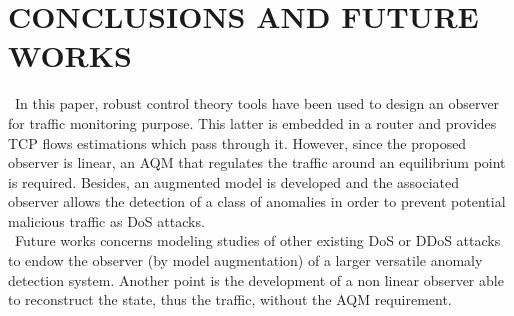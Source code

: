 \documentclass[a4paper, 10pt, onecolumn]{article}
\begin{document}
\section{CONCLUSIONS AND FUTURE WORKS}
~\indent In this paper, robust control theory tools have been used to design an observer for traffic monitoring purpose. This latter is embedded in a router and provides TCP flows estimations which pass through it. However, since the proposed observer is linear, an AQM that regulates the traffic around an equilibrium point is required. Besides, an augmented model is developed and the associated observer allows the detection of a class of anomalies in order to prevent potential malicious traffic as DoS attacks.\\
~\indent Future works concerns modeling studies of other existing DoS or DDoS attacks to endow the observer (by model augmentation) of a larger versatile anomaly detection system. Another point is the development of a non linear observer able to reconstruct the state, thus the traffic, without the AQM requirement.







\end{document}
